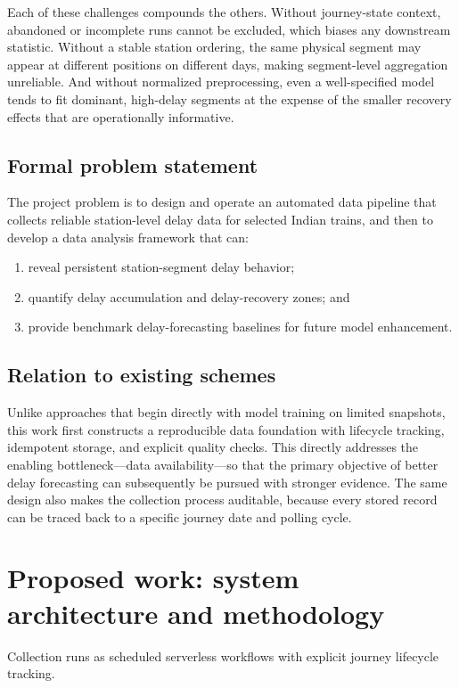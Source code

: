 \documentclass[a4paper,fleqn]{cas-dc}
\begin{document}
Each of these challenges compounds the others. Without journey-state context,
abandoned or incomplete runs cannot be excluded, which biases any downstream
statistic. Without a stable station ordering, the same physical segment may
appear at different positions on different days, making segment-level
aggregation unreliable. And without normalized preprocessing, even a
well-specified model tends to fit dominant, high-delay segments at the expense
of the smaller recovery effects that are operationally informative.

\subsection{Formal problem statement}
The project problem is to design and operate an automated data pipeline that
collects reliable station-level delay data for selected Indian trains, and
then to develop a data analysis framework that can:
\begin{enumerate}
    \item reveal persistent station-segment delay behavior;
    \item quantify delay accumulation and delay-recovery zones; and
    \item provide benchmark delay-forecasting baselines for future model
          enhancement.
\end{enumerate}

\subsection{Relation to existing schemes}
Unlike approaches that begin directly with model training on limited
snapshots, this work first constructs a reproducible data foundation with
lifecycle tracking, idempotent storage, and explicit quality checks. This
directly addresses the enabling bottleneck---data availability---so that the
primary objective of better delay forecasting can subsequently be pursued
with stronger evidence. The same design also makes the collection process
auditable, because every stored record can be traced back to a specific
journey date and polling cycle.

\section{Proposed work: system architecture and methodology}
\label{sec:proposed}

Collection runs as scheduled serverless workflows with explicit journey
lifecycle tracking.
\end{document}

